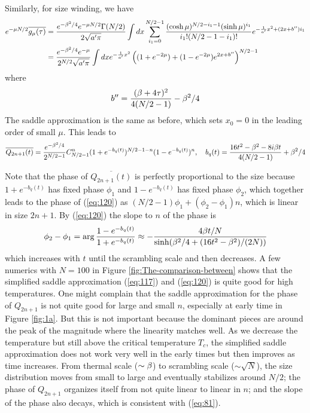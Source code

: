 \documentclass[11pt]{article}
\renewcommand{\>}{\rangle}
\newcommand{\<}{\langle}
\begin{document}
Similarly, for size winding, we have 
\begin{align}
e^{-\mu N/2}\overline{g_{\mu}(\tau)} & =\frac{e^{-\beta^{2}/4}e^{-\mu N/2}\Gamma(N/2)}{2\sqrt{a'\pi}}\int dx\sum_{i_{1}=0}^{N/2-1}\frac{(\cosh\mu)^{N/2-i_{1}-1}(\sinh\mu)^{i_{1}}}{i_{1}!(N/2-1-i_{1})!}e^{-\frac{1}{a'}x^{2}+(2x+b'')i_{1}}\nonumber \\
 & =\frac{e^{-\beta^{2}/4}e^{-\mu}}{2^{N/2}\sqrt{a'\pi}}\int dxe^{-\frac{1}{a'}x^{2}}\left((1+e^{-2\mu})+(1-e^{-2\mu})e^{2x+b''}\right)^{N/2-1}
\end{align}
where 
\begin{equation}
b''=\frac{(\beta+4\tau)^{2}}{4(N/2-1)}-\beta^{2}/4
\end{equation}
The saddle approximation is the same as before, which sets $x_{0}=0$
in the leading order of small $\mu$. This leads to
\begin{equation}
\overline{Q_{2n+1}(t)}=\frac{e^{-\beta^{2}/4}}{2^{N/2-1}}C_{N/2-1}^{n}(1+e^{-b_{q}(t)})^{N/2-1-n}(1-e^{-b_{q}(t)})^{n},\quad b_{q}(t)=\frac{16t^{2}-\beta^{2}-8i\beta t}{4(N/2-1)}+\beta^{2}/4\label{eq:120}
\end{equation}

Note that the phase of $\overline{Q_{2n+1}(t)}$ is perfectly proportional
to the size because $1+e^{-b_{q}(t)}$ has fixed phase $\phi_{1}$
and $1-e^{-b_{q}(t)}$ has fixed phase $\phi_{2}$, which together
leads to the phase of (\ref{eq:120}) as $(N/2-1)\phi_{1}+(\phi_{2}-\phi_{1})n$,
which is linear in size $2n+1$. By (\ref{eq:120}) the slope to $n$
of the phase is
\begin{equation}
\phi_{2}-\phi_{1}=\arg\frac{1-e^{-b_{q}(t)}}{1+e^{-b_{q}(t)}}\approx-\frac{4\beta t/N}{\sinh(\beta^{2}/4+(16t^{2}-\beta^{2})/(2N))}\label{eq:81}
\end{equation}
which increases with $t$ until the scrambling scale and then decreases.
A few numerics with $N=100$ in Figure \ref{fig:The-comparison-between}
shows that the simplified saddle approximation (\ref{eq:117}) and
(\ref{eq:120}) is quite good for high temperatures. One might complain
that the saddle approximation for the phase of $Q_{2n+1}$ is not
quite good for large and small $n$, especially at early time in Figure
\ref{fig:1a}. But this is not important because the dominant pieces
are around the peak of the magnitude where the linearity matches well.
As we decrease the temperature but still above the critical temperature $T_c$, the simplified saddle
approximation does not work very well in the early times but then improves as time increases. From thermal scale ($\sim\beta$) to scrambling scale
($\sim\sqrt{N}$), the size distribution moves from small to large
and eventually stabilizes around $N/2$; the phase of $Q_{2n+1}$ organizes
itself from not quite linear to linear in $n$; and the slope of the
phase also decays, which is consistent with (\ref{eq:81}).
\end{document}
